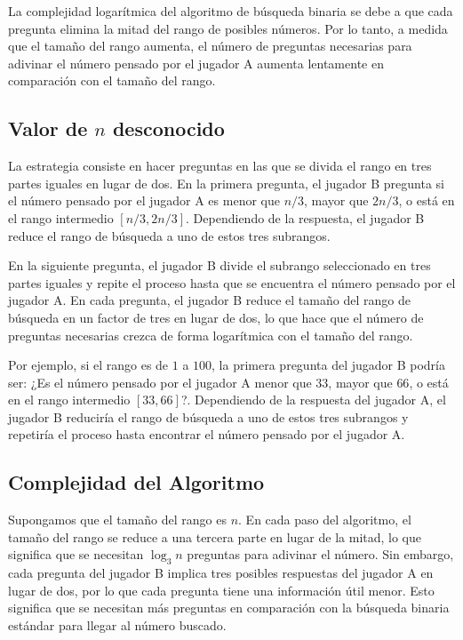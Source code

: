La complejidad logarítmica del algoritmo de búsqueda binaria se debe a que cada pregunta elimina la mitad del rango de posibles números. Por lo tanto, a medida que el tamaño del rango aumenta, el número de preguntas necesarias para adivinar el número pensado por el jugador A aumenta lentamente en comparación con el tamaño del rango.

\subsection{Valor de $n$ desconocido}

La estrategia consiste en hacer preguntas en las que se divida el rango en tres partes iguales en lugar de dos. En la primera pregunta, el jugador B pregunta si el número pensado por el jugador A es menor que $n/3$, mayor que $2n/3$, o está en el rango intermedio $[n/3, 2n/3]$. Dependiendo de la respuesta, el jugador B reduce el rango de búsqueda a uno de estos tres subrangos.

En la siguiente pregunta, el jugador B divide el subrango seleccionado en tres partes iguales y repite el proceso hasta que se encuentra el número pensado por el jugador A. En cada pregunta, el jugador B reduce el tamaño del rango de búsqueda en un factor de tres en lugar de dos, lo que hace que el número de preguntas necesarias crezca de forma logarítmica con el tamaño del rango.

Por ejemplo, si el rango es de $1$ a $100$, la primera pregunta del jugador B podría ser: ¿Es el número pensado por el jugador A menor que $33$, mayor que $66$, o está en el rango intermedio $[33, 66]$?. Dependiendo de la respuesta del jugador A, el jugador B reduciría el rango de búsqueda a uno de estos tres subrangos y repetiría el proceso hasta encontrar el número pensado por el jugador A.

\subsection{Complejidad del Algoritmo}

Supongamos que el tamaño del rango es $n$. En cada paso del algoritmo, el tamaño del rango se reduce a una tercera parte en lugar de la mitad, lo que significa que se necesitan $\log_3 n$ preguntas para adivinar el número. Sin embargo, cada pregunta del jugador B implica tres posibles respuestas del jugador A en lugar de dos, por lo que cada pregunta tiene una información útil menor. Esto significa que se necesitan más preguntas en comparación con la búsqueda binaria estándar para llegar al número buscado.
